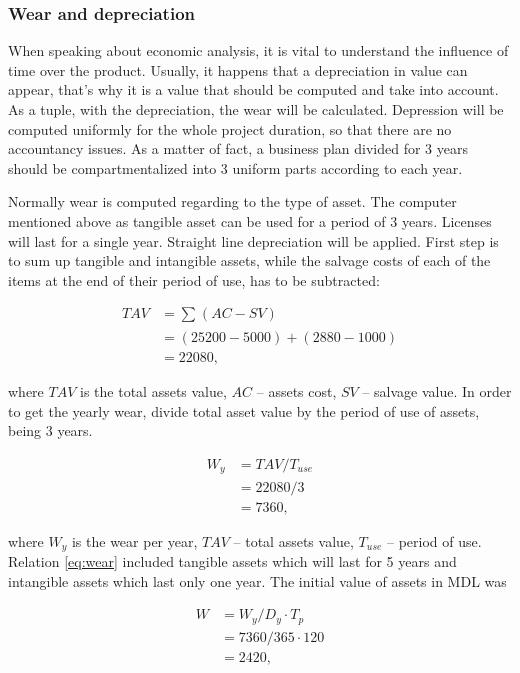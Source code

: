 \subsubsection{Wear and depreciation}
When speaking about economic analysis, it is vital to understand the influence of time over the product. Usually, it happens that a depreciation in value can appear, that's why it is a value that should be computed and take into account. As a tuple, with the depreciation, the wear will be calculated. Depression will be computed uniformly for the whole project duration, so that there are no accountancy issues. As a matter of fact, a business plan divided for 3 years should be compartmentalized into 3 uniform parts according to each year.

Normally wear is computed regarding to the type of asset. The computer mentioned above as tangible asset  can be used for a period of 3 years. Licenses will last for a single year. Straight line depreciation will be applied. First step is to sum up tangible and intangible assets, while the salvage costs of each of the items at the end of their period of use, has to be subtracted:

\begin{equation}
\begin{split}
TAV &= \sum_{} (AC - SV) \\
&= (25200 - 5000) + (2880 - 1000) \\
&= 22080,
\end{split}
\end{equation}

\noindent
where $TAV$ is the total assets value, $AC$ -- assets cost, $SV$ -- salvage value.
In order to get the yearly wear, divide total asset value by the period of use of assets, being 3 years.

\begin{equation} \label{eq:wear}
\begin{split}
W_y &= TAV / T_{use} \\
&= 22080/3\\
&= 7360,
\end{split}
\end{equation}

\noindent
where $W_y$ is the wear per year, $TAV$ -- total assets value, $T_{use}$ -- period of use. Relation \eqref{eq:wear} included tangible assets which will last for 5 years and intangible assets which last only one year. The initial value of assets in MDL was

\begin{equation}
\begin{split}
W &= W_y / D_y \cdot T_p\\
&= 7360  / 365  \cdot 120 \\
&= 2420,
\end{split}
\end{equation}
